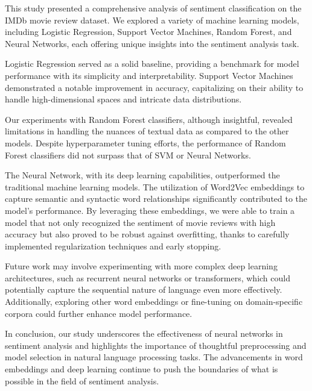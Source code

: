 \documentclass[conference]{IEEEtran}
\begin{document}
	This study presented a comprehensive analysis of sentiment classification on the IMDb movie review dataset. We explored a variety of machine learning models, including Logistic Regression, Support Vector Machines, Random Forest, and Neural Networks, each offering unique insights into the sentiment analysis task.
	
	Logistic Regression served as a solid baseline, providing a benchmark for model performance with its simplicity and interpretability. Support Vector Machines demonstrated a notable improvement in accuracy, capitalizing on their ability to handle high-dimensional spaces and intricate data distributions.
	
	Our experiments with Random Forest classifiers, although insightful, revealed limitations in handling the nuances of textual data as compared to the other models. Despite hyperparameter tuning efforts, the performance of Random Forest classifiers did not surpass that of SVM or Neural Networks.
	
	The Neural Network, with its deep learning capabilities, outperformed the traditional machine learning models. The utilization of Word2Vec embeddings to capture semantic and syntactic word relationships significantly contributed to the model's performance. By leveraging these embeddings, we were able to train a model that not only recognized the sentiment of movie reviews with high accuracy but also proved to be robust against overfitting, thanks to carefully implemented regularization techniques and early stopping.
	
	Future work may involve experimenting with more complex deep learning architectures, such as recurrent neural networks or transformers, which could potentially capture the sequential nature of language even more effectively. Additionally, exploring other word embeddings or fine-tuning on domain-specific corpora could further enhance model performance.
	
	In conclusion, our study underscores the effectiveness of neural networks in sentiment analysis and highlights the importance of thoughtful preprocessing and model selection in natural language processing tasks. The advancements in word embeddings and deep learning continue to push the boundaries of what is possible in the field of sentiment analysis.
	
	
	
	
\end{document}
